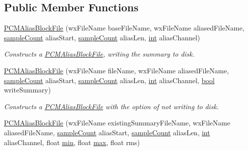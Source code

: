 \subsection*{Public Member Functions}
\begin{DoxyCompactItemize}
\item 
\hyperlink{class_p_c_m_alias_block_file_a7fd7930fee9ced8129b4fd073ab590eb}{P\+C\+M\+Alias\+Block\+File} (wx\+File\+Name base\+File\+Name, wx\+File\+Name aliased\+File\+Name, \hyperlink{include_2audacity_2_types_8h_afa427e1f521ea5ec12d054e8bd4d0f71}{sample\+Count} alias\+Start, \hyperlink{include_2audacity_2_types_8h_afa427e1f521ea5ec12d054e8bd4d0f71}{sample\+Count} alias\+Len, \hyperlink{xmltok_8h_a5a0d4a5641ce434f1d23533f2b2e6653}{int} alias\+Channel)
\begin{DoxyCompactList}\small\item\em Constructs a \hyperlink{class_p_c_m_alias_block_file}{P\+C\+M\+Alias\+Block\+File}, writing the summary to disk. \end{DoxyCompactList}\item 
\hyperlink{class_p_c_m_alias_block_file_aa7ec83e3eb9ac44e0e5006cc869893db}{P\+C\+M\+Alias\+Block\+File} (wx\+File\+Name file\+Name, wx\+File\+Name aliased\+File\+Name, \hyperlink{include_2audacity_2_types_8h_afa427e1f521ea5ec12d054e8bd4d0f71}{sample\+Count} alias\+Start, \hyperlink{include_2audacity_2_types_8h_afa427e1f521ea5ec12d054e8bd4d0f71}{sample\+Count} alias\+Len, \hyperlink{xmltok_8h_a5a0d4a5641ce434f1d23533f2b2e6653}{int} alias\+Channel, \hyperlink{mac_2config_2i386_2lib-src_2libsoxr_2soxr-config_8h_abb452686968e48b67397da5f97445f5b}{bool} write\+Summary)
\begin{DoxyCompactList}\small\item\em Constructs a \hyperlink{class_p_c_m_alias_block_file}{P\+C\+M\+Alias\+Block\+File} with the option of not writing to disk. \end{DoxyCompactList}\item 
\hyperlink{class_p_c_m_alias_block_file_aaa2be6a7bad017b8407a80ca01bee4a1}{P\+C\+M\+Alias\+Block\+File} (wx\+File\+Name existing\+Summary\+File\+Name, wx\+File\+Name aliased\+File\+Name, \hyperlink{include_2audacity_2_types_8h_afa427e1f521ea5ec12d054e8bd4d0f71}{sample\+Count} alias\+Start, \hyperlink{include_2audacity_2_types_8h_afa427e1f521ea5ec12d054e8bd4d0f71}{sample\+Count} alias\+Len, \hyperlink{xmltok_8h_a5a0d4a5641ce434f1d23533f2b2e6653}{int} alias\+Channel, float \hyperlink{_compare_audio_command_8cpp_abd8bbcfabb3ddef2ccaafb9928a37b95}{min}, float \hyperlink{_t_d_stretch_8cpp_ac39d9cef6a5e030ba8d9e11121054268}{max}, float rms)

\end{DoxyCompactItemize}
